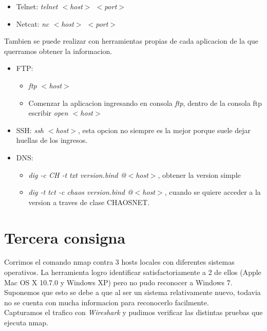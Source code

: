 \documentclass[a4paper]{article}
\begin{document}
\begin{itemize}
\item Telnet: \textit{telnet $<$host$>$  $<$port$>$}

\item Netcat: \textit{nc $<$host$>$ $<$port$>$}
\end{itemize} 

\clearpage

Tambien se puede realizar con herramientas propias de cada aplicacion de la que querramos obtener la informacion.

\begin{itemize}
\item FTP: \begin{itemize}
			\item \textit{ftp $<$host$>$}
			\item Comenzar la aplicacion ingresando en consola \textit{ftp}, dentro de la consola ftp escribir \textit{open $<$host$>$}
			\end{itemize}
			
\item SSH: \textit{ssh $<$host$>$}, esta opcion no siempre es la mejor porque suele dejar huellas de los ingresos.

\item DNS: \begin{itemize}
			\item \textit{dig -c CH -t txt version.bind @$<$host$>$}, obtener la version simple
			\item \textit{dig -t tct -c chaos version.bind @$<$host$>$}, cuando se quiere acceder a la version a traves de clase CHAOSNET.
			\end{itemize}
			
\end{itemize}


\newpage
\section{Tercera consigna}

Corrimos el comando nmap contra 3 hosts locales con diferentes sistemas operativos. La herramienta logro identificar satisfactoriamente a 2 de ellos (Apple Mac OS X 10.7.0 y Windows XP) pero no pudo reconocer a Windows 7. Suponemos que esto se debe a que al ser un sistema relativamente nuevo, todavia no se cuenta con mucha informacion para reconocerlo facilmente. \\


Capturamos el trafico con \textit{Wireshark} y pudimos verificar las distintas pruebas que ejecuta nmap.\\
\end{document}
